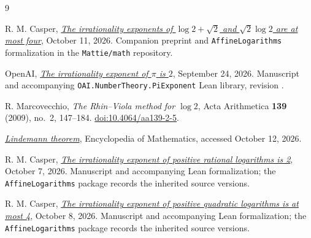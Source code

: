 \documentclass[11pt]{article}
\theoremstyle{remark}
\begin{document}
\begin{thebibliography}{9}
\raggedright
{}
R. M. Casper,
\emph{\href{https://github.com/Mattie/math/blob/cf1338bcee8fe9f08422ec36e8fdf6dc6392c677/preprints/The-irrationality-exponents-of-log-2-plus-sqrt2-and-sqrt2-log-2-are-at-most-4-October-11-2026/paper.pdf}{The irrationality exponents of $\log2+\sqrt2$ and
$\sqrt2\log2$ are at most four}}, October 11, 2026.
Companion preprint and \texttt{AffineLogarithms} formalization in the
\texttt{Mattie/math} repository.

OpenAI, \emph{\href{https://github.com/openai/math/tree/adc7f1241b42e322a6451854ab7e4b4c146bf78a/preprints/The-irrationality-exponent-of-pi-is-2-September-24-2026}{The irrationality exponent of $\pi$ is $2$}},
September 24, 2026. Manuscript and accompanying
\texttt{OAI.NumberTheory.PiExponent} Lean library, revision
.

R. Marcovecchio, \emph{The Rhin--Viola method for $\log2$},
Acta Arithmetica \textbf{139} (2009), no.~2, 147--184.
\href{https://doi.org/10.4064/aa139-2-5}{doi:10.4064/aa139-2-5}.

\emph{\href{https://encyclopediaofmath.org/wiki/Lindemann_theorem}{Lindemann theorem}},
Encyclopedia of Mathematics, accessed October 12, 2026.

R. M. Casper,
\emph{\href{https://github.com/Mattie/math/tree/0cfe10002ea95c45721b93d18bffbe2c3bbbcbbd/preprints/The-irrationality-exponent-of-positive-rational-logarithms-is-2-October-7-2026}{The irrationality exponent of positive rational logarithms is 2}},
October 7, 2026. Manuscript and accompanying Lean formalization;
the \texttt{AffineLogarithms} package records the inherited source versions.

R. M. Casper,
\emph{\href{https://github.com/Mattie/math/tree/4aa817179b5a81358dcdefeb1d454a31ab2f2c27/preprints/The-irrationality-exponent-of-positive-quadratic-logarithms-is-at-most-4-October-8-2026}{The irrationality exponent of positive quadratic logarithms is at most 4}},
October 8, 2026. Manuscript and accompanying Lean formalization;
the \texttt{AffineLogarithms} package records the inherited source versions.
\end{thebibliography}
\end{document}
